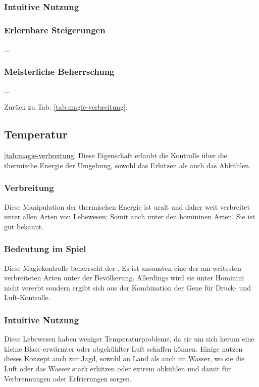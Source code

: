 \subsubsection{Intuitive Nutzung}

\subsubsection{Erlernbare Steigerungen}
\begin{outline}
	\1 ...
\end{outline}

\subsubsection{Meisterliche Beherrschung} 
\begin{outline}
	\1 ...
\end{outline}
Zurück zu Tab. \ref{tab:magie-verbreitung}.



\subsection{Temperatur}\label{sec:temperaturmagie} \ref{tab:magie-verbreitung}
Diese Eigenschaft erlaubt die Kontrolle über die thermische Energie der Umgebung, sowohl das Erhitzen als auch das Abkühlen.

\subsubsection{Verbreitung}
Diese Manipulation der thermischen Energie ist uralt und daher weit verbreitet unter allen Arten von Lebewesen; Somit auch unter den homininen Arten. Sie ist gut bekannt.

\subsubsection{Bedeutung im Spiel}
Diese Magiekontrolle beherrscht der . Es ist ansonsten eine der am weitesten verbreiteten Arten unter der Bevölkerung. Allerdings wird sie unter Hominini nicht vererbt sondern ergibt sich aus der Kombination der Gene für Druck- und Luft-Kontrolle.

\subsubsection{Intuitive Nutzung}
Diese Lebewesen haben weniger Temperaturprobleme, da sie um sich herum eine kleine Blase erwärmter oder abgekühlter Luft schaffen können. Einige nutzen dieses Konzept auch zur Jagd, sowohl an Land als auch im Wasser, wo sie die Luft oder das Wasser stark erhitzen oder extrem abkühlen und damit für Verbrennungen oder Erfrierungen sorgen.

